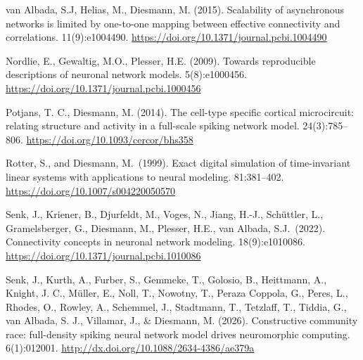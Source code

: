 \documentclass[10pt,a4paper,twoside,american]{article}
\theoremstyle{definitionstyle}
\begin{document}
{}
\begin{thebibliography}{}

  van Albada, S.J, Helias, M., Diesmann, M. (2015).
  \newblock Scalability of asynchronous networks is limited by one-to-one mapping between effective connectivity and correlations.
   11(9):e1004490.
  \newblock \url{https://doi.org/10.1371/journal.pcbi.1004490}

   Nordlie, E., Gewaltig, M.O., Plesser, H.E. (2009).
  \newblock Towards reproducible descriptions of neuronal network models.
   5(8):e1000456.
  \newblock \url{https://doi.org/10.1371/journal.pcbi.1000456}

  Potjans, T. C., Diesmann, M. (2014).
  \newblock The cell-type specific cortical microcircuit: relating structure and activity in a full-scale spiking network model. 
   24(3):785–806.
  \newblock \url{https://doi.org/10.1093/cercor/bhs358}

  Rotter, S., and Diesmann, M.~(1999).
  \newblock Exact digital simulation of time-invariant linear systems with applications to neural modeling.
   81:381--402.
  \newblock \url{https://doi.org/10.1007/s004220050570}

  Senk, J., Kriener, B., Djurfeldt, M., Voges, N., Jiang, H.-J., Sch\"uttler, L., Gramelsberger, G., Diesmann, M., Plesser, H.E., van Albada, S.J.~(2022).
  \newblock Connectivity concepts in neuronal network modeling.
   18(9):e1010086.
  \newblock \url{https://doi.org/10.1371/journal.pcbi.1010086}
  
  Senk, J., Kurth, A., Furber, S., Gemmeke, T., Golosio, B., Heittmann, A., Knight, J. C., M\"uller, E., Noll, T., Nowotny, T., Peraza Coppola, G., Peres, L., Rhodes, O., Rowley, A., Schemmel, J., Stadtmann, T., Tetzlaff, T., Tiddia, G., van Albada, S. J., Villamar, J., \& Diesmann, M. (2026). 
  \newblock Constructive community race: full-density spiking neural network model drives neuromorphic computing.
   6(1):012001.
  \newblock \url{http://dx.doi.org/10.1088/2634-4386/ae379a}  
  
\end{thebibliography}
\end{document}
